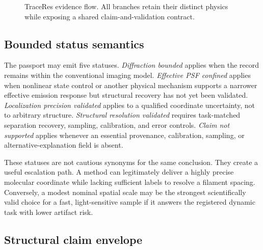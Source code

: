 \documentclass[conference]{IEEEtran}
\begin{document}
\begin{figure}[t]
\centering
{}
\caption{TraceRes evidence flow. All branches retain their distinct physics while exposing a shared claim-and-validation contract.}
\label{fig:traceres-flow}
\end{figure}

\subsection{Bounded status semantics}

The passport may emit five statuses. \emph{Diffraction bounded} applies when the record remains within the conventional imaging model. \emph{Effective PSF confined} applies when nonlinear state control or another physical mechanism supports a narrower effective emission response but structural recovery has not yet been validated. \emph{Localization precision validated} applies to a qualified coordinate uncertainty, not to arbitrary structure. \emph{Structural resolution validated} requires task-matched separation recovery, sampling, calibration, and error controls. \emph{Claim not supported} applies whenever an essential provenance, calibration, sampling, or alternative-explanation field is absent.

These statuses are not cautious synonyms for the same conclusion. They create a useful escalation path. A method can legitimately deliver a highly precise molecular coordinate while lacking sufficient labels to resolve a filament spacing. Conversely, a modest nominal spatial scale may be the strongest scientifically valid choice for a fast, light-sensitive sample if it answers the registered dynamic task with lower artifact risk.

\subsection{Structural claim envelope}
\end{document}
